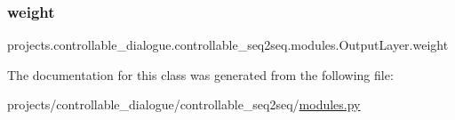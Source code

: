 \subsubsection{\texorpdfstring{weight}{weight}}
{\footnotesize\ttfamily projects.\+controllable\+\_\+dialogue.\+controllable\+\_\+seq2seq.\+modules.\+Output\+Layer.\+weight}



The documentation for this class was generated from the following file\+:\begin{DoxyCompactItemize}
\item 
projects/controllable\+\_\+dialogue/controllable\+\_\+seq2seq/\hyperlink{projects_2controllable__dialogue_2controllable__seq2seq_2modules_8py}{modules.\+py}\end{DoxyCompactItemize}
